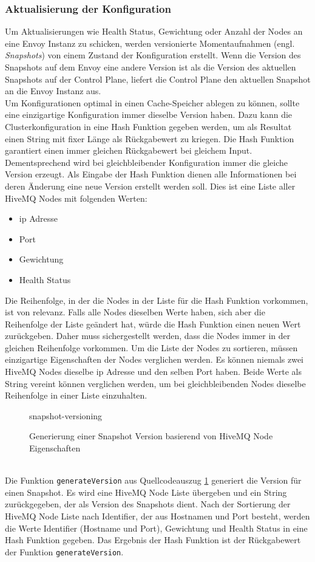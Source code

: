 \subsubsection{Aktualisierung der Konfiguration}
Um Aktualisierungen wie Health Status, Gewichtung oder Anzahl der Nodes an eine Envoy Instanz zu schicken, werden versionierte Momentaufnahmen (engl. \textit{Snapshots}) von einem Zustand der Konfiguration erstellt. Wenn die Version des Snapshots auf dem Envoy eine andere Version ist als die Version des aktuellen Snapshots auf der Control Plane, liefert die Control Plane den aktuellen Snapshot an die Envoy Instanz aus.
\\
Um Konfigurationen optimal in einen Cache-Speicher ablegen zu können, sollte eine einzigartige Konfiguration immer dieselbe Version haben.
Dazu kann die Clusterkonfiguration in eine Hash Funktion gegeben werden, um als Resultat einen String mit fixer Länge als Rückgabewert zu kriegen. Die Hash Funktion garantiert einen immer gleichen Rückgabewert bei gleichem Input. Dementsprechend wird bei gleichbleibender Konfiguration immer die gleiche Version erzeugt.
Als Eingabe der Hash Funktion dienen alle Informationen bei deren Änderung eine neue Version erstellt werden soll. Dies ist eine Liste aller HiveMQ Nodes mit folgenden Werten:
\begin{itemize}
  \item \ac{ip} Adresse
  \item Port
  \item Gewichtung
  \item Health Status
\end{itemize}
Die Reihenfolge, in der die Nodes in der Liste für die Hash Funktion vorkommen, ist von relevanz. Falls alle Nodes dieselben Werte haben, sich aber die Reihenfolge der Liste geändert hat, würde die Hash Funktion einen neuen Wert zurückgeben. Daher muss sichergestellt werden, dass die Nodes immer in der gleichen Reihenfolge vorkommen. Um die Liste der Nodes zu sortieren, müssen einzigartige Eigenschaften der Nodes verglichen werden.
Es können niemals zwei HiveMQ Nodes dieselbe \ac{ip} Adresse und den selben Port haben. Beide Werte als String vereint können verglichen werden, um bei gleichbleibenden Nodes dieselbe Reihenfolge in einer Liste einzuhalten.
\begin{figure}
    {snapshot-versioning}
    \caption{Generierung einer Snapshot Version basierend von HiveMQ Node Eigenschaften}
    \label{code:snapshot-versioning}
\end{figure}
\\
Die Funktion \verb|generateVersion| aus Quellcodeauszug \ref{code:snapshot-versioning} generiert die Version für einen Snapshot. Es wird eine HiveMQ Node Liste übergeben und ein String zurückgegeben, der als Version des Snapshots dient. Nach der Sortierung der HiveMQ Node Liste nach Identifier, der aus Hostnamen und Port besteht, werden die Werte Identifier (Hostname und Port), Gewichtung und Health Status in eine Hash Funktion gegeben. Das Ergebnis der Hash Funktion ist der Rückgabewert der Funktion \verb|generateVersion|.

